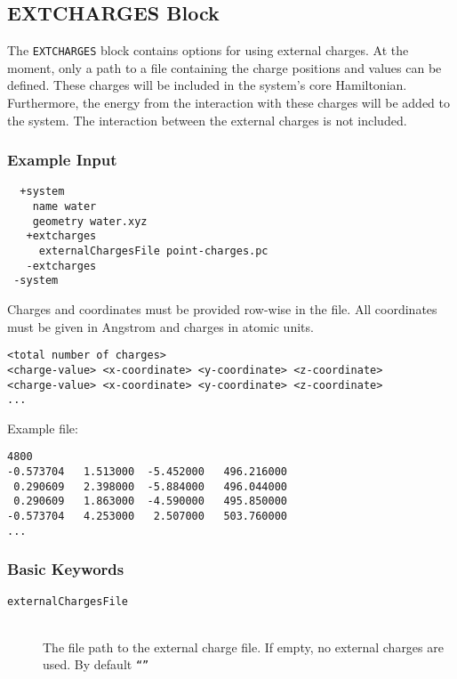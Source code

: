 \documentclass[bibliography=totocnumbered,a4paper,10pt,oneside]{scrbook}
\newcommand{\ttt}[1]{%
  \begingroup\setlength{\fboxsep}{1pt}%
  \colorbox{serenity-green!30}{\texttt{\hspace*{2pt}\vphantom{(g}#1\hspace*{2pt}}}%
  \endgroup
}
\begin{document}
\subsection{EXTCHARGES Block}\label{sec:system:extchrg}
The \ttt{EXTCHARGES} block contains options for using external charges. At the moment, only a path
to a file containing the charge positions and values can be defined. These charges will be included in
the system's core Hamiltonian. Furthermore, the energy from the interaction with these charges will be added to
the system. The interaction between the external charges is not included.
\subsubsection{Example Input}
\begin{lstlisting}
  +system
    name water
    geometry water.xyz
   +extcharges
     externalChargesFile point-charges.pc
   -extcharges
 -system
\end{lstlisting}
Charges and coordinates must be provided row-wise in the file. All coordinates must be given in Angstrom and charges
in atomic units.
\begin{lstlisting}
<total number of charges>
<charge-value> <x-coordinate> <y-coordinate> <z-coordinate>
<charge-value> <x-coordinate> <y-coordinate> <z-coordinate>
...
\end{lstlisting}
Example file:
\begin{lstlisting}
4800
-0.573704   1.513000  -5.452000   496.216000
 0.290609   2.398000  -5.884000   496.044000
 0.290609   1.863000  -4.590000   495.850000
-0.573704   4.253000   2.507000   503.760000
...
\end{lstlisting}
\subsubsection{Basic Keywords}
\begin{description}
  \item [\texttt{externalChargesFile}]\hfill \\
  The file path to the external charge file. If empty, no external charges are used. By default \ttt{``''}
\end{description}

\clearpage
\end{document}
